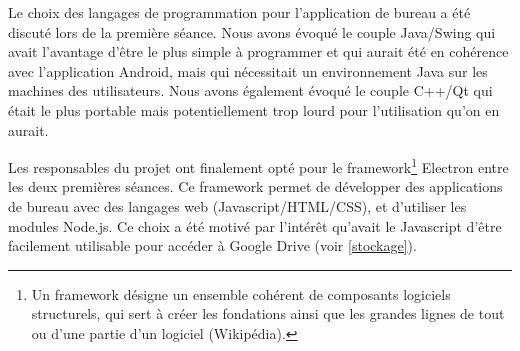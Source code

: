 \par
Le choix des langages de programmation pour l'application de bureau a été discuté lors de la première séance. Nous avons évoqué le couple Java/Swing qui avait l'avantage d'être le plus simple à programmer et qui aurait été en cohérence avec l'application Android, mais qui nécessitait un environnement Java sur les machines des utilisateurs. Nous avons également évoqué le couple C++/Qt qui était le plus portable mais potentiellement trop lourd pour l'utilisation qu'on en aurait. 
\par
Les responsables du projet ont finalement opté pour le framework\footnote{Un framework désigne un ensemble cohérent de composants logiciels structurels, qui sert à créer les fondations ainsi que les grandes lignes de tout ou d’une partie d'un logiciel (Wikipédia).} Electron entre les deux premières séances. Ce framework permet de développer des applications de bureau avec des langages web (Javascript/HTML/CSS), et d'utiliser les modules Node.js. Ce choix a été motivé par l'intérêt qu'avait le Javascript d'être facilement utilisable pour accéder à Google Drive (voir \ref{stockage}).\\